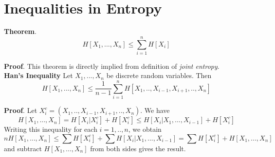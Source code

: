 \documentclass[10pt]{article}
\begin{document}
\section{Inequalities in Entropy}
\textbf{Theorem}.
\[ H[X_1,...,X_n] \leqslant \sum_{i=1}^{n}H[X_i]\]

\textbf{Proof}. This theorem is directly implied from definition of \textit{joint entropy}.\\
\textbf{Han's Inequality}
Let $X_1,...,X_n$ be discrete random variables. Then
\[ H[X_1,...,X_n] \leqslant \frac{1}{n-1}\sum_{i=1}^{n}H[X_1,..,X_{i-1},X_{i+1},..,X_n] \]

\textbf{Proof}. Let $X_{i}^{c}=(X_1,..,X_{i-1},X_{i+1},..,X_n)$. We have
\[ H[X_1,...,X_n] = H[X_i | X_{i}^{c}] + H[X_{i}^{c}] \leqslant H[X_i|X_1,...,X_{i-1}] + H[X_{i}^{c}] \]
Writing this inequality for each $i=1,..,n$, we obtain
\[ n H[X_1,...,X_n] \leqslant \sum H[X_i^c] + \sum H[X_{i}|X_1,...,X_{i-1}] =\sum H[X_i^c] +  H[X_1,...,X_n]\]
and subtract $H[X_1,...,X_n]$ from both sides gives the result.
\end{document}
